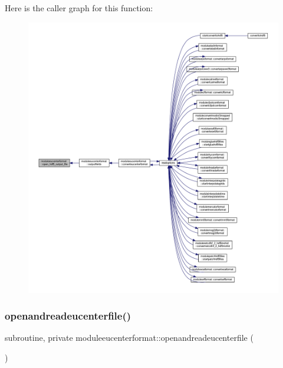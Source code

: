 Here is the caller graph for this function\+:\nopagebreak
\begin{figure}[H]
\begin{center}
\leavevmode
\includegraphics[width=350pt]{namespacemoduleeucenterformat_a8e53ba660eb9e964abe2de913b95c20f_icgraph}
\end{center}
\end{figure}
\mbox{\label{namespacemoduleeucenterformat_a82e8b7c6bd570b0435fd58801a248e44}} 
\subsubsection{\texorpdfstring{openandreadeucenterfile()}{openandreadeucenterfile()}}
{\footnotesize\ttfamily subroutine, private moduleeucenterformat\+::openandreadeucenterfile (\begin{DoxyParamCaption}{ }\end{DoxyParamCaption})\hspace{0.3cm}{\ttfamily [private]}}

